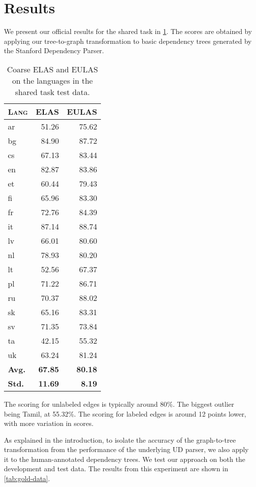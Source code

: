 \documentclass[11pt,a4paper]{article}
\begin{document}
\section{Results}
We present our official results for the shared task in
\cref{tab:test}. The scores are obtained by applying our
tree-to-graph transformation to basic dependency trees generated
by the Stanford Dependency Parser.

\begin{table}[h]
	\centering
	\begin{tabular}{l|rr}
		\textsc{Lang} & \textsc{ELAS} & \textsc{EULAS} \\
		\hline
		ar  & 51.26 & 75.62 \\
		bg  & 84.90 & 87.72\\
		cs  & 67.13 & 83.44 \\
		en  & 82.87 & 83.86 \\
		et  & 60.44 & 79.43 \\
		fi  & 65.96 & 83.30 \\
		fr  & 72.76 & 84.39 \\
		it  & 87.14 & 88.74 \\
		lv  & 66.01 & 80.60 \\
		nl  & 78.93 & 80.20 \\
		lt  & 52.56 & 67.37 \\
		pl  & 71.22 & 86.71 \\
		ru  & 70.37 & 88.02 \\
		sk  & 65.16 & 83.31 \\
		sv  & 71.35 & 73.84 \\
		ta  & 42.15 & 55.32 \\
		uk  & 63.24 & 81.24 \\
		\textbf{Avg.} & \textbf{67.85} & \textbf{80.18} \\
        \textbf{Std.} & \textbf{11.69} & \textbf{8.19} \\
	\end{tabular}
\caption{\label{tab:test} Coarse ELAS and EULAS on the languages in the shared task test data.}
\end{table}

The scoring for unlabeled edges is typically around 80\%. The biggest
outlier being Tamil, at 55.32\%. The scoring for labeled edges is
around 12 points lower, with more variation in scores.

As explained in the introduction, to isolate the accuracy of
the graph-to-tree transformation from the performance of the
underlying UD parser, we also apply it to the human-annotated
dependency trees. We test our approach on both the development and
test data. The results from this experiment are shown in
\cref{tab:gold-data}.
\end{document}
